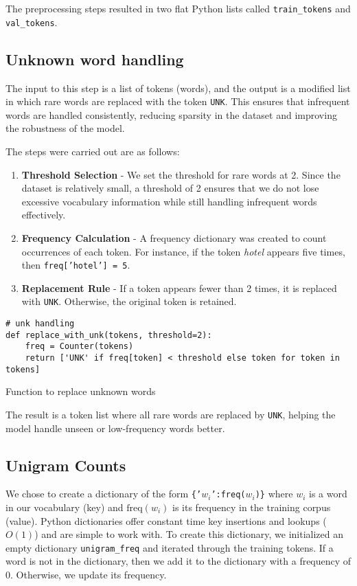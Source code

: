 \documentclass[a4paper]{article}
\begin{document}
The preprocessing steps resulted in two flat Python lists called \texttt{train\_tokens} and \texttt{val\_tokens}.

\subsection{Unknown word handling}
The input to this step is a list of tokens (words), and the output is a modified list in which rare words are replaced with the token \texttt{UNK}. This ensures that infrequent words are handled consistently, reducing sparsity in the dataset and improving the robustness of the model.

The steps were carried out are as follows:
\begin{enumerate}
\item \textbf{Threshold Selection} - We set the threshold for rare words at 2. Since the dataset is relatively small, a threshold of 2 ensures that we do not lose excessive vocabulary information while still handling infrequent words effectively.
\item \textbf{Frequency Calculation} - A frequency dictionary was created to count occurrences of each token. For instance, if the token \textit{hotel} appears five times, then \texttt{freq['hotel'] = 5}.
\item \textbf{Replacement Rule} - If a token appears fewer than 2 times, it is replaced with \texttt{UNK}. Otherwise, the original token is retained.
\end{enumerate}
\begin{listing}[ht]
\begin{verbatim}
# unk handling
def replace_with_unk(tokens, threshold=2):
    freq = Counter(tokens)
    return ['UNK' if freq[token] < threshold else token for token in tokens]
\end{verbatim}
\caption{Function to replace unknown words}
\label{lst:unknown word handling}
\end{listing}
The result is a token list where all rare words are replaced by \texttt{UNK}, helping the model handle unseen or low-frequency words better. 

\subsection{Unigram Counts}
We chose to create a dictionary of the form \texttt{\{'$w_i$':freq($w_i$)\}} where $w_i$ is a word in our vocabulary (key) and $\text{freq}(w_i)$ is its frequency in the training corpus (value). Python dictionaries offer constant time key insertions and lookups ($O(1)$) and are simple to work with. To create this dictionary, we initialized an empty dictionary \texttt{unigram\_freq} and iterated through the training tokens. If a word is not in the dictionary, then we add it to the dictionary with a frequency of 0. Otherwise, we update its frequency.
\end{document}
